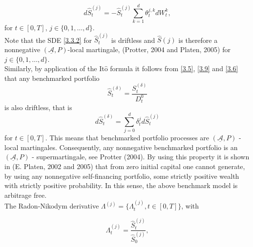 \documentclass[a4 paper, 12pt]{report}
\theoremstyle{plain}
\begin{document}
\begin{equation}\label{3.3.2}
d\hat{S}_t^{(j)} = -\hat{S}_t^{(j)}\sum_{k = 1}^d\theta_t^{j,k}dW_t^k,
\end{equation}
for $t\in[0,T]$, $j\in\{0,1,\ldots,d\}$.\\
Note that the SDE \eqref{3.3.2} for $\hat{S}_t^{(j)}$  is driftless and $\hat{S}(j)$ is therefore a
nonnegative $(\mathcal{\underline{A}}, P)$-local martingale, (Protter, 2004 and Platen, 2005) for $j \in \{0,
1,\ldots, d\}.$\\
Similarly, by application of the It$\hat{\mbox{o}}$ formula it follows from \eqref{3.5}, \eqref{3.9} and \eqref{3.6} that any benchmarked portfolio
\begin{equation}\label{3.3.3}
\hat{S}_t^{(\delta)} = \frac{S_t^{(\delta)}}{D_t^0}
\end{equation}
is also driftless, that is
\begin{equation}\label{3.3.4}
d\hat{S}_t^{(\delta)} = \sum_{j = 0}^d\delta_t^jd\hat{S}_t^{(j)}
\end{equation}
for $t \in [0, T].$ This means that benchmarked portfolio processes are $(\mathcal{\underline{A}}, P)$ - local martingales. Consequently, any nonnegative benchmarked portfolio is an $(\mathcal{\underline{A}}, P)$ -
supermartingale, see Protter (2004). By using this property it is shown in (E. Platen, 2002 and 2005) that from zero initial capital one cannot generate, by
using any nonnegative self-financing portfolio, some strictly positive wealth with
strictly positive probability. In this sense, the above benchmark model is
arbitrage free.\\
The Radon-Nikodym derivative $\Lambda^{(j)} = \{\Lambda_t^{(j)},t\in[0,T]\}$, with

\begin{equation}\label{3.3.5}
\Lambda_t^{(j)} = \frac{\hat{S}_t^{(j)}}{\hat{S}_0^{(j)}},
\end{equation}
\end{document}
